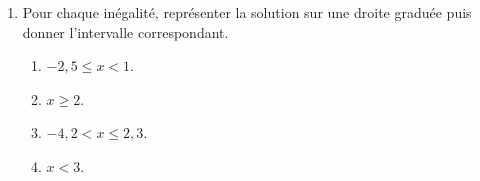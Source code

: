 \begin{exercice}
\begin{multicols}{2}
\begin{enumerate}
\begin{enumerate}
            \end{enumerate}
         \item Pour chaque inégalité, représenter la solution sur une droite graduée puis donner l'intervalle correspondant. \medskip
            \begin{enumerate}
               \item $-2,5\leq x<1$. \\
               \item $x\geq2$. \\
               \item $-4,2<x\leq2,3$. \\
               \item $x<3$.
            \end{enumerate}
      \end{enumerate}
   \end{multicols}
\end{exercice}


